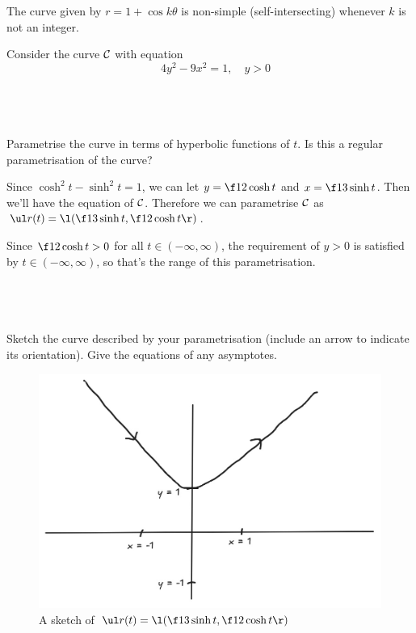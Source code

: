 \documentclass[a4paper]{article}
\begin{document}
The curve given by $r = 1 + \cos k\theta$ is non-simple (self-intersecting) whenever $k$ is not an integer.


\begin{questionbody}
Consider the curve $\cal C$ with equation \[
\quad 4y^2 - 9x^2 = 1, \quad y > 0
\]
\end{questionbody}

\subsection{~} %

\begin{questionbody}
Parametrise the curve in terms of hyperbolic functions of $t$. Is this a regular parametrisation of the curve?
\end{questionbody}

Since $\cosh^2 t - \sinh^2 t = 1$, we can let $y = \f12 \cosh t$ and $x = \f13 \sinh t$. Then we'll have the equation of $\cal C$. Therefore we can parametrise $\cal C$ as $\ul r(t) = \l( \f13 \sinh t, \f12 \cosh t \r)$.

Since $\f12 \cosh t > 0$ for all $t \in (-\infty, \infty)$, the requirement of $y>0$ is satisfied by $t \in (-\infty, \infty)$, so that's the range of this parametrisation.

\subsection{~} %

\begin{questionbody}
Sketch the curve described by your parametrisation (include an arrow to indicate its orientation). Give the equations of any asymptotes.
\end{questionbody}

\begin{figure}[h]
    \centering
    \includegraphics[scale=0.3]{Q2b}
    \caption{A sketch of $\ul r(t) = \l( \f13 \sinh t, \f12 \cosh t \r)$}
\end{figure}
\end{document}
